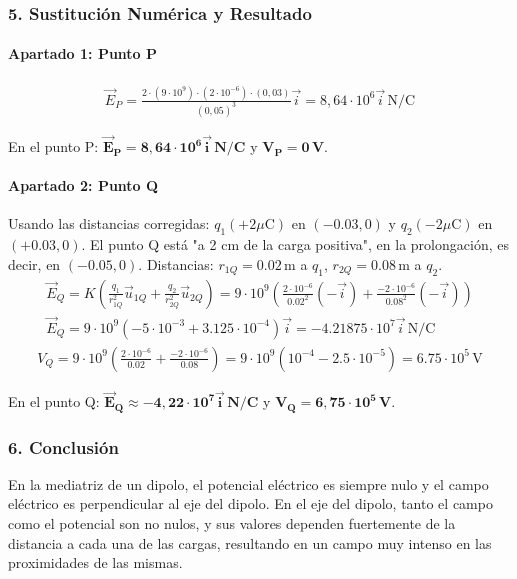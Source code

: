 \subsubsection*{5. Sustitución Numérica y Resultado}
\paragraph{Apartado 1: Punto P}
\begin{gather}
    \vec{E}_P = \frac{2 \cdot (9 \cdot 10^9) \cdot (2 \cdot 10^{-6}) \cdot (0,03)}{(0,05)^3} \vec{i} = 8,64 \cdot 10^6 \vec{i} \, \text{N/C}
\end{gather}
\begin{cajaresultado}
    En el punto P: $\boldsymbol{\vec{E}_P = 8,64 \cdot 10^6 \vec{i} \, \textbf{N/C}}$ y $\boldsymbol{V_P = 0 \, \textbf{V}}$.
\end{cajaresultado}

\paragraph{Apartado 2: Punto Q}
Usando las distancias corregidas: $q_1(+2\mu\text{C})$ en $(-0.03,0)$ y $q_2(-2\mu\text{C})$ en $(+0.03,0)$. El punto Q está "a 2 cm de la carga positiva", en la prolongación, es decir, en $(-0.05, 0)$.
Distancias: $r_{1Q} = 0.02\,\text{m}$ a $q_1$, $r_{2Q} = 0.08\,\text{m}$ a $q_2$.
\begin{gather}
    \vec{E}_Q = K \left( \frac{q_1}{r_{1Q}^2} \vec{u}_{1Q} + \frac{q_2}{r_{2Q}^2} \vec{u}_{2Q} \right) = 9\cdot10^9 \left( \frac{2\cdot10^{-6}}{0.02^2}(-\vec{i}) + \frac{-2\cdot10^{-6}}{0.08^2}(-\vec{i}) \right) \nonumber \\
    \vec{E}_Q = 9\cdot10^9 \left( -5 \cdot 10^{-3} + 3.125 \cdot 10^{-4} \right)\vec{i} = -4.21875 \cdot 10^7 \vec{i} \, \text{N/C}
\end{gather}
\begin{gather}
    V_Q = 9\cdot10^9 \left( \frac{2\cdot10^{-6}}{0.02} + \frac{-2\cdot10^{-6}}{0.08} \right) = 9\cdot10^9 (10^{-4} - 2.5\cdot10^{-5}) = 6.75 \cdot 10^5 \, \text{V}
\end{gather}
\begin{cajaresultado}
    En el punto Q: $\boldsymbol{\vec{E}_Q \approx -4,22 \cdot 10^7 \vec{i} \, \textbf{N/C}}$ y $\boldsymbol{V_Q = 6,75 \cdot 10^5 \, \textbf{V}}$.
\end{cajaresultado}

\subsubsection*{6. Conclusión}
\begin{cajaconclusion}
En la mediatriz de un dipolo, el potencial eléctrico es siempre nulo y el campo eléctrico es perpendicular al eje del dipolo. En el eje del dipolo, tanto el campo como el potencial son no nulos, y sus valores dependen fuertemente de la distancia a cada una de las cargas, resultando en un campo muy intenso en las proximidades de las mismas.
\end{cajaconclusion}

